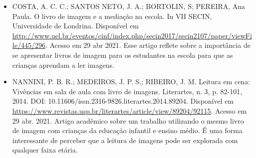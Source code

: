 \documentclass[11pt]{extarticle}
\begin{document}
\begin{itemize}
\item COSTA, A. C. C.; SANTOS NETO, J. A.; BORTOLIN, S; PEREIRA, Ana Paula. O livro de imagem e a mediação na escola. 
In VII SECIN, Universidade de Londrina. Disponível em \url{http://www.uel.br/eventos/cinf/index.php/secin2017/secin2107/paper/viewFile/445/296}. 
Acesso em 29 abr 2021. 
Esse artigo reflete sobre a importância de se apresentar livros de imagem para os estudantes na escola para que as crianças aprendam a ler imagens. 

\item NANNINI, P. B. R.; MEDEIROS, J. P. S.; RIBEIRO, J. M. Leitura em cena: Vivências em sala de aula com livro de imagens. 
Literartes, n. 3, p. 82-101, 2014. DOI: 10.11606/issn.2316-9826.literartes.2014.89204. 
Disponível em \url{https://www.revistas.usp.br/literartes/article/view/89204/92115}. Acesso em 29 abr. 2021. 
Artigo acadêmico sobre um trabalho utilizando o mesmo livro de imagem com crianças da educação infantil e ensino médio. 
É uma forma interessante de perceber que a leitura de imagens pode ser explorada com qualquer faixa etária. 
\end{itemize}

% 
\end{document}

